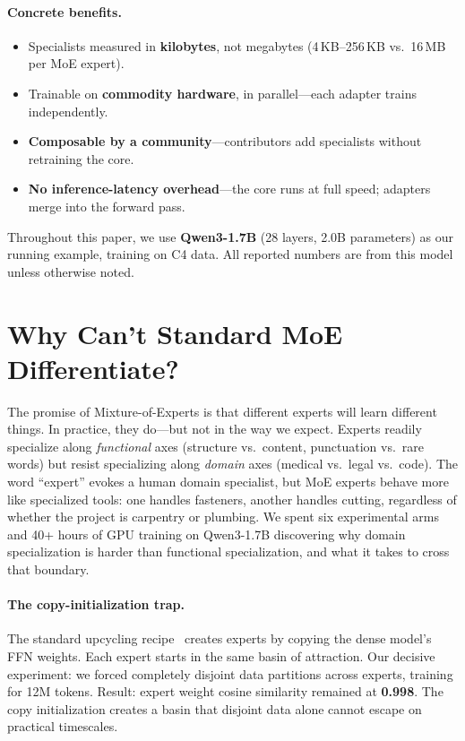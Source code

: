\documentclass{article}
\begin{document}
\paragraph{Concrete benefits.}
\begin{itemize}
    \item Specialists measured in \textbf{kilobytes}, not megabytes (4\,KB--256\,KB vs.\ 16\,MB per MoE expert).
    \item Trainable on \textbf{commodity hardware}, in parallel---each adapter trains independently.
    \item \textbf{Composable by a community}---contributors add specialists without retraining the core.
    \item \textbf{No inference-latency overhead}---the core runs at full speed; adapters merge into the forward pass.
\end{itemize}

Throughout this paper, we use \textbf{Qwen3-1.7B} (28 layers, 2.0B parameters)
as our running example, training on C4 data. All reported numbers are from this
model unless otherwise noted.

\section{Why Can't Standard MoE Differentiate?}
\label{sec:why-moe-fails}

The promise of Mixture-of-Experts is that different experts will learn different
things. In practice, they do---but not in the way we expect. Experts readily
specialize along \emph{functional} axes (structure vs.\ content, punctuation
vs.\ rare words) but resist specializing along \emph{domain} axes (medical
vs.\ legal vs.\ code). The word ``expert'' evokes a human domain specialist,
but MoE experts behave more like specialized tools: one handles
fasteners, another handles cutting, regardless of whether the project is
carpentry or plumbing. We spent six experimental arms and 40+ hours of GPU
training on Qwen3-1.7B discovering why domain specialization is harder than
functional specialization, and what it takes to cross that boundary.

\paragraph{The copy-initialization trap.}
The standard upcycling recipe~\cite{komatsuzaki2023sparse} creates experts by
copying the dense model's FFN weights. Each expert starts in the same basin of
attraction. Our decisive experiment: we forced completely disjoint data
partitions across experts, training for 12M tokens. Result: expert weight cosine
similarity remained at \textbf{0.998}. The copy initialization creates a basin
that disjoint data alone cannot escape on practical timescales.
\end{document}
